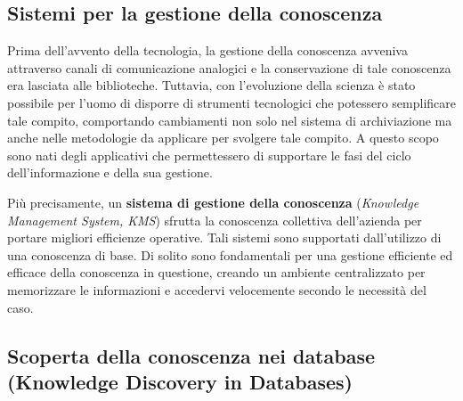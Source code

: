 \subsection{Sistemi per la gestione della conoscenza}

Prima dell'avvento della tecnologia, la gestione della conoscenza avveniva attraverso canali di comunicazione analogici e la conservazione di tale conoscenza era lasciata alle biblioteche. Tuttavia, con l’evoluzione della scienza è stato possibile per l’uomo di disporre di strumenti tecnologici che potessero semplificare tale compito, comportando cambiamenti non solo nel sistema di archiviazione ma anche nelle metodologie da applicare per svolgere tale compito. A questo scopo sono nati degli applicativi che permettessero di supportare le fasi del ciclo dell’informazione e della sua gestione.

Più precisamente, un \textbf{sistema di gestione della conoscenza} (\textit{Knowledge Management System, KMS}) sfrutta la conoscenza collettiva dell’azienda per portare migliori efficienze operative. Tali sistemi sono supportati dall’utilizzo di una conoscenza di base. Di solito sono fondamentali per una gestione efficiente ed efficace della conoscenza in questione, creando un ambiente centralizzato per memorizzare le informazioni e accedervi velocemente secondo le necessità del caso.\cite{ibm_knowledge_management}

\subsection{Scoperta della conoscenza nei database (Knowledge Discovery in Databases)}

